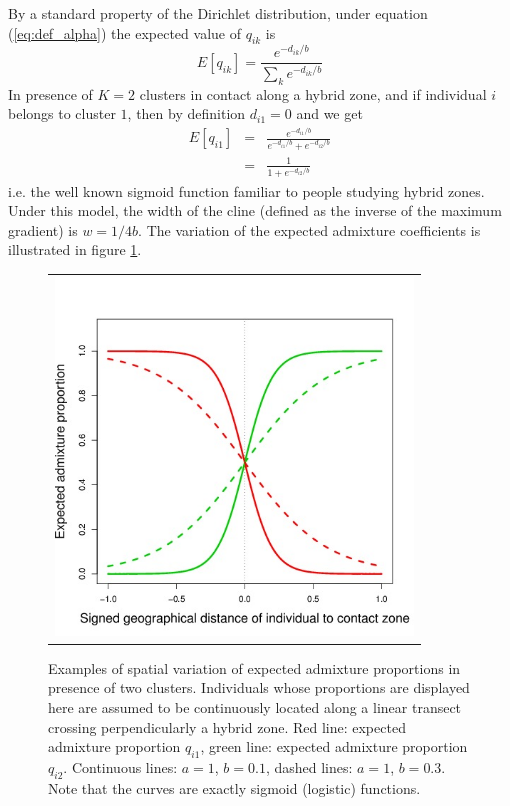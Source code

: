 \documentclass[a4paper,10pt]{article}
\begin{document}
By a standard property of the Dirichlet distribution, under equation (\ref{eq:def_alpha}) the expected value of $q_{ik}$ is 
\begin{equation}\label{eq:expect_q}
  E[q_{ik}] = \frac{e^{-d_{ik}/b}}{\sum_k e^{-d_{ik}/b}}
\end{equation}
In presence of $K=2$ clusters in contact along a hybrid zone, 
and if individual $i$ belongs to cluster $1$, 
then by definition $d_{i1}=0$ and we get 
\begin{eqnarray}
  E[q_{i1}] & = & \frac{e^{-d_{i1}/b}}{e^{-d_{i1}/b}+e^{-d_{i2}/b}} \nonumber \\
 & = & \frac{1}{1+e^{-d_{i2}/b}} \label{eq:expect_q_K=2}
\end{eqnarray}
i.e. the well known sigmoid function familiar to people studying hybrid zones.
Under this model, the width of the cline (defined as the inverse of the maximum gradient) is $w=1/4b$.
The variation of the expected admixture coefficients is illustrated in figure \ref{fig:exp_q}.


\begin{figure}[h]
\begin{tabular}{c}
\vspace{-.1cm}\hspace{3cm} \includegraphics[width=9.5cm]{fig/exp_q_quart.jpeg} \\
\end{tabular}
\caption{Examples of spatial variation of expected admixture proportions in presence of two clusters. 
Individuals whose proportions are displayed here are assumed to be continuously located along a linear 
transect crossing perpendicularly a hybrid zone. 
 Red line: expected admixture proportion $q_{i1}$, 
green line: expected admixture proportion $q_{i2}$. 
Continuous lines: $a=1$, $b=0.1$, dashed lines: $a=1$, $b=0.3$.
Note that the curves are exactly sigmoid (logistic) functions. }\label{fig:exp_q}
\end{figure}
\end{document}
